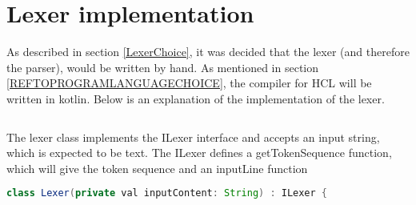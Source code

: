 \section{Lexer implementation}
As described in section \ref{LexerChoice}, it was decided that the lexer (and therefore the parser), would be written by hand.
As mentioned in section \ref{REFTOPROGRAMLANGUAGECHOICE}, the compiler for HCL will be written in kotlin.
Below is an explanation of the implementation of the lexer.
\begin{lstlisting}[language=java,label=lis:Lexer,caption=The Lexer .,firstnumber=1]


\end{lstlisting}
The lexer class implements the ILexer interface and accepts an input string, which is expected to be text.
The ILexer defines a getTokenSequence function, which will give the token sequence and an inputLine function

\begin{lstlisting}[language=java,label=lis:Lexer,caption=The Lexer .,firstnumber=8]
class Lexer(private val inputContent: String) : ILexer {
\end{lstlisting}